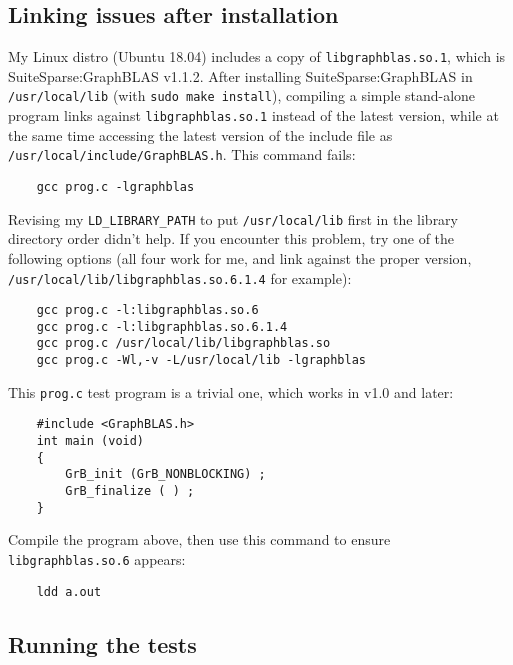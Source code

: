 \documentclass[12pt]{article}
\begin{document}
\subsection{Linking issues after installation}

My Linux distro (Ubuntu 18.04) includes a copy of \verb'libgraphblas.so.1',
which is SuiteSparse:GraphBLAS v1.1.2.  After installing SuiteSparse:GraphBLAS
in \verb'/usr/local/lib' (with \verb'sudo make install'), compiling a simple
stand-alone program links against \verb'libgraphblas.so.1' instead of the
latest version, while at the same time accessing the latest version of the
include file as \verb'/usr/local/include/GraphBLAS.h'.  This command fails:

    {\small
    \begin{verbatim}
    gcc prog.c -lgraphblas \end{verbatim} }

Revising my \verb'LD_LIBRARY_PATH' to put \verb'/usr/local/lib' first in the
library directory order didn't help.  If you encounter this problem, try one of
the following options (all four work for me, and link against the proper
version, \verb'/usr/local/lib/libgraphblas.so.6.1.4' for example):

    {\small
    \begin{verbatim}
    gcc prog.c -l:libgraphblas.so.6
    gcc prog.c -l:libgraphblas.so.6.1.4
    gcc prog.c /usr/local/lib/libgraphblas.so
    gcc prog.c -Wl,-v -L/usr/local/lib -lgraphblas \end{verbatim} }

This \verb'prog.c' test program is a trivial one, which works in v1.0 and
later:

    {\small
    \begin{verbatim}
    #include <GraphBLAS.h>
    int main (void)
    {
        GrB_init (GrB_NONBLOCKING) ;
        GrB_finalize ( ) ;
    } \end{verbatim} }

Compile the program above, then use this command to ensure
\verb'libgraphblas.so.6' appears:

    {\small
    \begin{verbatim}
    ldd a.out \end{verbatim} }

\subsection{Running the tests}
\end{document}
